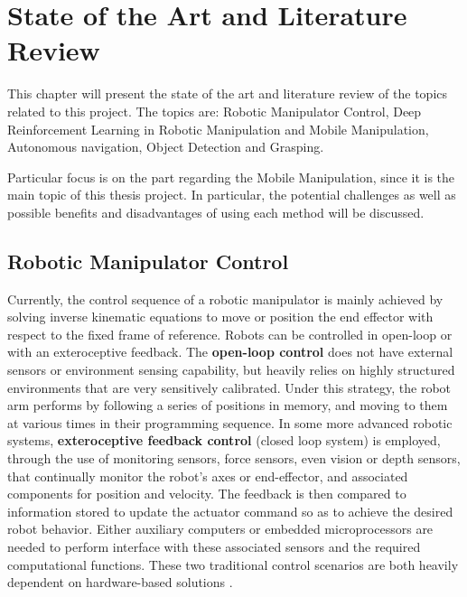 
\chapter{State of the Art and Literature Review}

This chapter will present the state of the art and literature review of the topics related to this project.
The topics are: Robotic Manipulator Control, Deep Reinforcement Learning in Robotic Manipulation and Mobile
Manipulation, Autonomous navigation, Object Detection and Grasping.

Particular focus is on the part regarding the Mobile Manipulation, since it is the main topic of 
this thesis project. In particular, the potential challenges as well as possible
benefits and disadvantages of using each method will be discussed.

\section{Robotic Manipulator Control}

Currently, the control sequence of a robotic manipulator is mainly achieved by solving
inverse kinematic equations to move or position the end effector with respect to the
fixed frame of reference. Robots can be controlled in open-loop or with
an exteroceptive feedback. The \textbf{open-loop control} does not have external sensors or
environment sensing capability, but heavily relies on highly structured environments
that are very sensitively calibrated. Under this strategy, the robot arm performs by
following a series of positions in memory, and moving to them at various times in their
programming sequence. In some more advanced robotic systems, \textbf{exteroceptive feedback
	control} (closed loop system) is employed, through the use of monitoring sensors, force sensors,
even vision or depth sensors, that continually monitor the robot's axes or end-effector, and
associated components for position and velocity. The feedback is then compared to information
stored to update the actuator command so as to achieve the desired robot behavior. Either
auxiliary computers or embedded microprocessors are needed to perform interface with
these associated sensors and the required computational functions. These two traditional
control scenarios are both heavily dependent on hardware-based solutions \cite{liu2021deep}.

